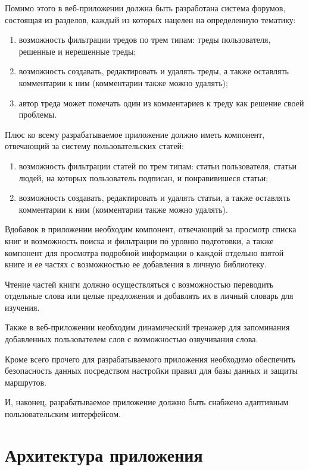 Помимо этого в веб-приложении должна быть разработана система форумов, состоящая из разделов, каждый из которых нацелен на определенную тематику: 

\begin{enumerate}
	\item возможность фильтрации тредов по трем типам: треды пользователя, решенные и нерешенные треды;
	\item возможность создавать, редактировать и удалять треды, а также оставлять комментарии к ним (комментарии также можно удалять);
	\item автор треда может помечать один из комментариев к треду как решение своей проблемы.
\end{enumerate}

Плюс ко всему разрабатываемое приложение должно иметь компонент, отвечающий за систему пользовательских статей:

\begin{enumerate}
	\item возможность фильтрации статей по трем типам: статьи пользователя, статьи людей, на которых пользователь подписан, и понравивишеся статьи;
	\item возможность создавать, редактировать и удалять статьи, а также оставлять комментарии к ним (комментарии также можно удалять).
\end{enumerate}

Вдобавок в приложении необходим компонент, отвечающий за просмотр списка книг и возможность поиска и фильтрации по уровню подготовки, а также компонент для просмотра подробной информации о каждой отдельно взятой книге и ее частях с возможностью ее добавления в личную библиотеку.

Чтение частей книги должно осуществляться с возможностью переводить отдельные слова или целые предложения и добавлять их в личный словарь для изучения.

Также в веб-приложении необходим динамический тренажер для запоминания добавленных пользователем слов с возможностью озвучивания слова.

Кроме всего прочего для разрабатываемого приложения необходимо обеспечить безопасность данных посредством настройки правил для базы данных и защиты маршрутов.

И, наконец, разрабатываемое приложение должно быть снабжено адаптивным пользовательским интерфейсом.


\section{Архитектура приложения}

